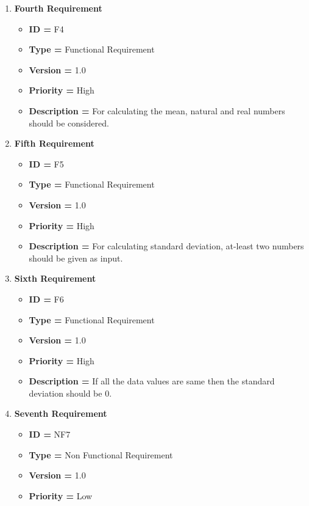 \documentclass[12pt,a4paper]{report}
\begin{document}
\begin{enumerate}[noitemsep]
        \newpage
        \item \textbf{Fourth Requirement}
        \begin{itemize}[noitemsep]
            \item \textbf{ID = } F4
            \item\textbf{Type = } Functional Requirement
            \item\textbf{Version = } 1.0
            \item\textbf{Priority = } High
            \item\textbf{Description = }   For calculating the mean, natural and real numbers should be considered.
        \end{itemize}
        \item \textbf{Fifth Requirement}
        \begin{itemize}[noitemsep]
            \item \textbf{ID = } F5
            \item\textbf{Type = } Functional Requirement
            \item\textbf{Version = } 1.0
            \item\textbf{Priority = } High
            \item\textbf{Description = }   For calculating standard deviation, at-least two numbers should be given as input.
        \end{itemize}
        \item \textbf{Sixth Requirement}
        \begin{itemize}[noitemsep]
            \item \textbf{ID = } F6
            \item\textbf{Type = } Functional Requirement
            \item\textbf{Version = } 1.0
            \item\textbf{Priority = } High
            \item\textbf{Description = }   If all the data values are same then the standard deviation should be 0.
        \end{itemize}
        \item \textbf{Seventh Requirement}
        \begin{itemize}[noitemsep]
            \item \textbf{ID = } NF7
            \item\textbf{Type = } Non Functional Requirement
            \item\textbf{Version = } 1.0
            \item\textbf{Priority = } Low

\end{itemize}
\end{enumerate}
\end{document}
